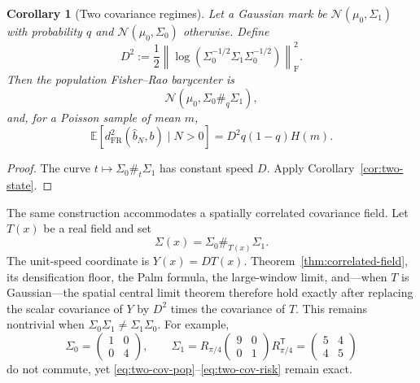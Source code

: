 \documentclass[11pt,a4paper]{article}
\newtheorem{corollary}[theorem]{Corollary}
\theoremstyle{remark}
\newcommand{\EE}{\mathbb E}
\begin{document}
\begin{corollary}[Two covariance regimes]
\label{cor:two-covariance}
Let a Gaussian mark be \(\mathcal N(\mu_0,\Sigma_1)\) with probability \(q\) and \(\mathcal N(\mu_0,\Sigma_0)\) otherwise.  Define
\begin{equation}
\label{eq:D-spd}
 D^2:=\frac12
 \left\|\log\!\left(\Sigma_0^{-1/2}\Sigma_1\Sigma_0^{-1/2}\right)\right\|_{\mathrm F}^2.
\end{equation}
Then the population Fisher--Rao barycenter is
\begin{equation}
\label{eq:two-cov-pop}
 \mathcal N(\mu_0,\Sigma_0\#_q\Sigma_1),
\end{equation}
and, for a Poisson sample of mean \(m\),
\begin{equation}
\label{eq:two-cov-risk}
 \EE[d_{\mathrm{FR}}^2(\widehat b_N,b)\mid N>0]
 =D^2q(1-q)H(m).
\end{equation}
\end{corollary}

\begin{proof}
The curve \(t\mapsto\Sigma_0\#_t\Sigma_1\) has constant speed \(D\).  Apply Corollary~\ref{cor:two-state}.
\end{proof}

The same construction accommodates a spatially correlated covariance field.  Let \(T(x)\) be a real field and set
\begin{equation}
\label{eq:cov-geodesic-field}
 \Sigma(x)=\Sigma_0\#_{T(x)}\Sigma_1.
\end{equation}
The unit-speed coordinate is \(Y(x)=DT(x)\).  Theorem~\ref{thm:correlated-field}, its densification floor, the Palm formula, the large-window limit, and---when \(T\) is Gaussian---the spatial central limit theorem therefore hold exactly after replacing the scalar covariance of \(Y\) by \(D^2\) times the covariance of \(T\).  This remains nontrivial when \(\Sigma_0\Sigma_1\ne\Sigma_1\Sigma_0\).  For example,
\[
 \Sigma_0=\begin{pmatrix}1&0\\0&4\end{pmatrix},
 \qquad
 \Sigma_1=R_{\pi/4}\begin{pmatrix}9&0\\0&1\end{pmatrix}R_{\pi/4}^{\mathsf T}
 =\begin{pmatrix}5&4\\4&5\end{pmatrix}
\]
do not commute, yet \eqref{eq:two-cov-pop}--\eqref{eq:two-cov-risk} remain exact.
\end{document}
